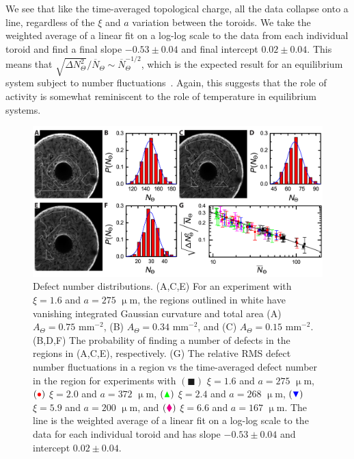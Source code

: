 We see that like the time-averaged topological charge, all the data collapse onto a line, regardless of the $\xi$ and $a$ variation between the toroids.
We take the weighted average of a linear fit on a log-log scale to the data from each individual toroid and find a final slope $-0.53 \pm 0.04$ and final intercept $0.02 \pm 0.04$.
This means that $\displaystyle{\sqrt{\Delta N_{\Theta}^2}} \bigg / \displaystyle {\overbar{N}_{\Theta}} \sim \overbar{N}_{\Theta}^{-1/2}$, which is the expected result for an equilibrium system subject to number fluctuations~\cite{RN311, gaussianApprox}.
Again, this suggests that the role of activity is somewhat reminiscent to the role of temperature in equilibrium systems.
\begin{figure}
  \centering
  \includegraphics{figures/C3/Ch3-Figs_ExpDistribution.png}
  \caption{Defect number distributions.
  (A,C,E) For an experiment with $\xi = 1.6$ and $a = 275$ $\upmu$m, the regions outlined in white have vanishing integrated Gaussian curvature and total area (A) $A_{\Theta} = 0.75$ mm$^{-2}$, (B) $A_{\Theta} = 0.34$ mm$^{-2}$, and (C) $A_{\Theta} = 0.15$ mm$^{-2}$.
  (B,D,F) The probability of finding a number of defects in the regions in (A,C,E), respectively.
  (G) The relative RMS defect number fluctuations in a region vs the time-averaged defect number in the region for experiments with
  $({\blacksquare})$ $\xi = 1.6 $ and $a = 275$ $\upmu$m,
  $({\color{red} \bullet})$ $\xi = 2.0 $ and $a = 372$ $\upmu$m,
  $({\color{green} \blacktriangle})$ $\xi = 2.4 $ and $a = 268$ $\upmu$m,
  $({\color{blue} \blacktriangledown})$ $\xi = 5.9$ and $a = 200$ $\upmu$m, and
  $({\color{magenta} \blacklozenge})$ $\xi = 6.6$ and $a = 167$ $\upmu$m.
  The line is the weighted average of a linear fit on a log-log scale to the data for each individual toroid and has slope $-0.53 \pm 0.04$ and intercept $0.02 \pm 0.04$.}\label{f:3-ExpDistribution}
\end{figure}



